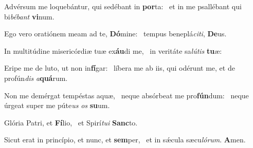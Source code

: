 \item Advérsum me loquebántur, qui sedébant in \textbf{por}ta:~\psstar{} et in me psallébant qui bi\textit{bébant} \textbf{vi}num.

\item Ego vero oratiónem meam ad te, \textbf{Dó}mine:~\psstar{} tempus beneplá\textit{citi}, \textbf{De}us.

\item In multitúdine misericórdiæ tuæ ex\textbf{áu}di me,~\psstar{} in veritáte sa\textit{lútis} \textbf{tu}æ:

\item Eripe me de luto, ut non in\textbf{fí}gar:~\psstar{} líbera me ab iis, qui odérunt me, et de profún\textit{dis} \textit{a}\textbf{quá}rum.

\item Non me demérgat tempéstas aquæ,~\pscross{} neque absórbeat me pro\textbf{fún}dum:~\psstar{} neque úrgeat super me púte\textit{us} \textit{os} \textbf{su}um.

\item Glória Patri, et \textbf{Fí}lio,~\psstar{} et Spirí\textit{tui} \textbf{Sanc}to.

\item Sicut erat in princípio, et nunc, et \textbf{sem}per,~\psstar{} et in sǽcula sæcu\textit{lórum}. \textbf{A}men.

